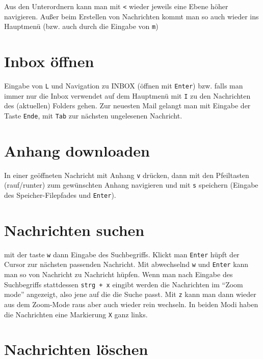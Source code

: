 \documentclass[]{book}
\begin{document}
Aus den Unterordnern kann man mit \texttt{\textless{}} wieder jeweils eine Ebene höher navigieren. Außer beim Erstellen von Nachrichten kommt man so auch wieder ins Hauptmenü (bzw. auch durch die Eingabe von \texttt{m})

\hypertarget{inbox-offnen}{%
\section{Inbox öffnen}\label{inbox-offnen}}

Eingabe von \texttt{L} und Navigation zu INBOX (öffnen mit \texttt{Enter}) bzw. falls man immer nur die Inbox verwendet auf dem Hauptmenü mit \texttt{I} zu den Nachrichten des (aktuellen) Folders gehen. Zur neuesten Mail gelangt man mit Eingabe der Taste \texttt{Ende}, mit \texttt{Tab} zur nächsten ungelesenen Nachricht.

\hypertarget{anhang-downloaden}{%
\section{Anhang downloaden}\label{anhang-downloaden}}

In einer geöffneten Nachricht mit Anhang \texttt{v} drücken, dann mit den Pfeiltasten (rauf/runter) zum gewünschten Anhang navigieren und mit \texttt{s} speichern (Eingabe des Speicher-Filepfades und \texttt{Enter}).

\hypertarget{nachrichten-suchen}{%
\section{Nachrichten suchen}\label{nachrichten-suchen}}

mit der taste \texttt{w} dann Eingabe des Suchbegriffs. Klickt man \texttt{Enter} hüpft der Cursor zur nächsten passenden Nachricht. Mit abwechselnd \texttt{w} und \texttt{Enter} kann man so von Nachricht zu Nachricht hüpfen.
Wenn man nach Eingabe des Suchbegriffs stattdessen \texttt{strg\ +\ x} eingibt werden die Nachrichten im ``Zoom mode'' angezeigt, also jene auf die die Suche passt. Mit \texttt{z} kann man dann wieder aus dem Zoom-Mode raus aber auch wieder rein wechseln. In beiden Modi haben die Nachrichten eine Markierung \texttt{X} ganz links.

\hypertarget{nachrichten-loschen}{%
\section{Nachrichten löschen}\label{nachrichten-loschen}}
\end{document}
